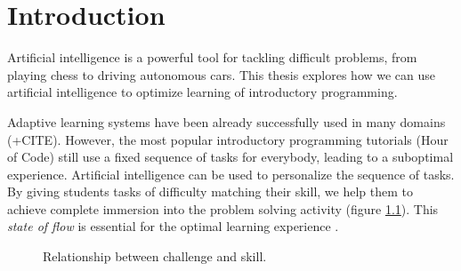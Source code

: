 \chapter{Introduction}
\label{chap:introduction}

Artificial intelligence is a powerful tool for tackling difficult problems,
from playing chess to driving autonomous cars. %
This thesis explores how we can use artificial intelligence to optimize
learning of introductory programming.

Adaptive learning systems have been already successfully used in many domains
\cite{alg.evaluation-geography} (+CITE).
However, the most popular introductory programming tutorials
(Hour of Code) still use a fixed sequence of tasks for everybody,
leading to a suboptimal experience.
Artificial intelligence can be used to personalize the sequence of tasks.
By giving students tasks of difficulty matching their skill,
we help them to achieve complete immersion into the problem solving
activity (figure \ref{fig:flow}).
This \emph{state of flow} \cite{flow}
is essential for the optimal learning experience
\cite{adaptive-practice}.

\begin{figure}[htb]
  \centering
  \caption{Relationship between challenge and skill.}
  \label{fig:flow}
\end{figure}



